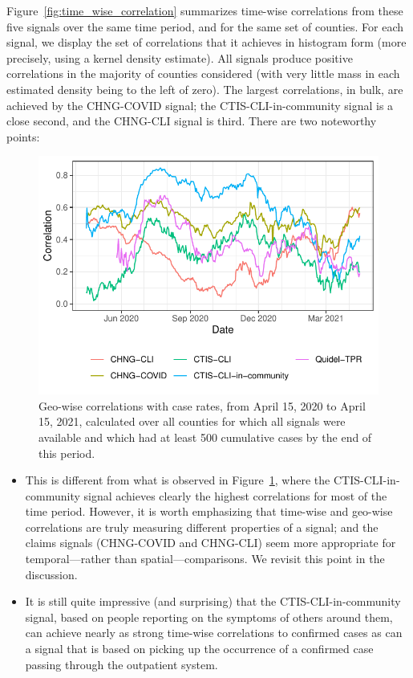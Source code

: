 \documentclass[9pt,twocolumn,twoside,lineno]{pnas-new}
\begin{document}
Figure~\ref{fig:time_wise_correlation} summarizes time-wise correlations from
these five signals over the same time period, and for the same set of counties.
For each signal, we display the set of correlations that it achieves in
histogram form (more precisely, using a kernel density estimate). All signals
produce positive correlations in the majority of counties considered (with very
little mass in each estimated density being to the left of zero). The largest
correlations, in bulk, are achieved by the CHNG-COVID signal; the
CTIS-CLI-in-community signal is a close second, and the CHNG-CLI signal is
third. There are two noteworthy points:

\begin{figure}[t]
  \includegraphics[width=\columnwidth]{fig/geo_wise_corr.pdf}
  \caption{Geo-wise correlations with case rates, from April 15, 2020 to April
    15, 2021, calculated over all counties for which all signals were available
    and which had at least 500 cumulative cases by the end of this period.}
  \label{fig:geo_wise_correlation}
\end{figure}

\begin{itemize}
\item This is different from what is observed in
  Figure~\ref{fig:geo_wise_correlation}, where the CTIS-CLI-in-community signal
  achieves clearly the highest correlations for most of the time period.
  However, it is worth emphasizing that time-wise and geo-wise
  correlations are truly measuring different properties of a signal; and the
  claims signals (CHNG-COVID and CHNG-CLI) seem more appropriate for
  temporal---rather than spatial---comparisons.  We revisit this point in the
  discussion.

\item It is still quite impressive (and surprising) that the
  CTIS-CLI-in-community signal, based on people reporting on the symptoms of
  others around them, can achieve  nearly as strong time-wise correlations to
  confirmed cases as can a signal that is based on picking up the occurrence of
  a confirmed case passing through the outpatient system.
\end{itemize}
\end{document}
